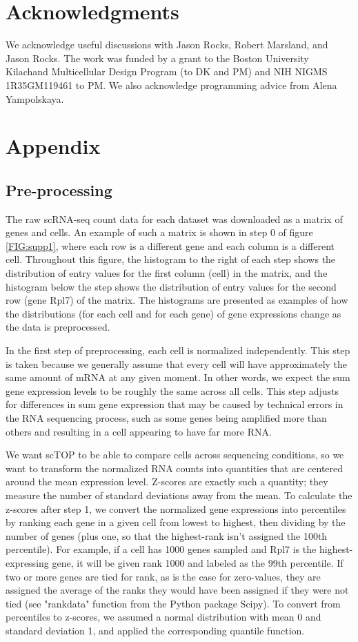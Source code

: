 \documentclass[aps,superscriptaddress, notitlepage,longbibliography]{revtex4-1}
\newcommand{\beginsupplement}{%
        \setcounter{table}{0}
        \renewcommand{\thetable}{S\arabic{table}}%
        \setcounter{figure}{0}
        \renewcommand{\thefigure}{S\arabic{figure}}%
     }
\begin{document}
\section*{Acknowledgments}
We acknowledge useful discussions with Jason Rocks, Robert Marsland, and Jason Rocks. The work was funded by a grant to the Boston University Kilachand Multicellular Design Program (to DK and PM) and NIH NIGMS 1R35GM119461 to PM. We also acknowledge programming advice from Alena Yampolskaya.


\section*{Appendix}
\beginsupplement
\subsection{Pre-processing} \label{preprocessing}
The raw scRNA-seq count data for each dataset was downloaded as a matrix of genes and cells. An example of such a matrix is shown in step 0 of figure \ref{FIG:supp1}, where each row is a different gene and each column is a different cell. Throughout this figure, the histogram to the right of each step shows the distribution of entry values for the first column (cell) in the matrix, and the histogram below the step shows the distribution of entry values for the second row (gene Rpl7) of the matrix. The histograms are presented as examples of how the distributions (for each cell and for each gene) of gene expressions change as the data is preprocessed.

In the first step of preprocessing, each cell is normalized independently. This step is taken because we generally assume that every cell will have approximately the same amount of mRNA at any given moment. In other words, we expect the sum gene expression levels to be roughly the same across all cells. This step adjusts for differences in sum gene expression that may be caused by technical errors in the RNA sequencing process, such as some genes being amplified more than others and resulting in a cell appearing to have far more RNA. 

We want scTOP to be able to compare cells across sequencing conditions, so we want to transform the normalized RNA counts into quantities that are centered around the mean expression level. Z-scores are exactly such a quantity; they measure the number of standard deviations away from the mean. To calculate the z-scores after step 1, we convert the normalized gene expressions into percentiles by ranking each gene in a given cell from lowest to highest, then dividing by the number of genes (plus one, so that the highest-rank isn't assigned the 100th percentile). For example, if a cell has 1000 genes sampled and Rpl7 is the highest-expressing gene, it will be given rank 1000 and labeled as the 99th percentile. If two or more genes are tied for rank, as is the case for zero-values, they are assigned the average of the ranks they would have been assigned if they were not tied (see "rankdata" function from the Python package Scipy). To convert from percentiles to z-scores, we assumed a normal distribution with mean 0 and standard deviation 1, and applied the corresponding quantile function.
\end{document}

